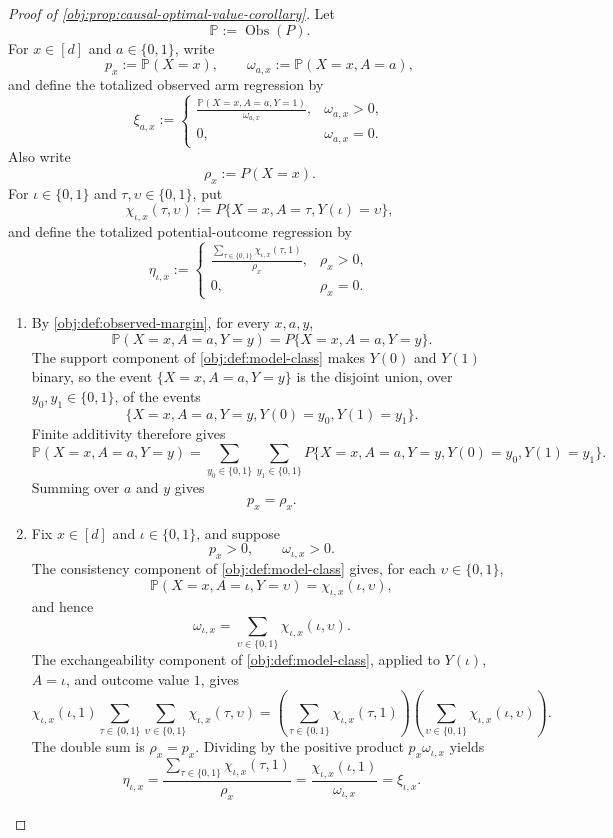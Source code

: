 \documentclass[11pt]{article}
\begin{document}
\begin{proof}[Proof of \cref{obj:prop:causal-optimal-value-corollary}]
Let
\[
\mathbb P:=\operatorname{Obs}(P).
\]
For \(x\in[d]\) and \(a\in\{0,1\}\), write
\[
p_x:=\mathbb P(X=x),
\qquad
\omega_{a,x}:=\mathbb P(X=x,A=a),
\]
and define the totalized observed arm regression by
\[
\xi_{a,x}:=
\begin{cases}
\displaystyle
\frac{\mathbb P(X=x,A=a,Y=1)}{\omega_{a,x}},
& \omega_{a,x}>0,\\[1.2ex]
0,& \omega_{a,x}=0.
\end{cases}
\]
Also write
\[
\rho_x:=P(X=x).
\]
For \(\iota\in\{0,1\}\) and \(\tau,\upsilon\in\{0,1\}\), put
\[
\chi_{\iota,x}(\tau,\upsilon)
:=
P\{X=x,A=\tau,Y(\iota)=\upsilon\},
\]
and define the totalized potential-outcome regression by
\[
\eta_{\iota,x}:=
\begin{cases}
\displaystyle
\frac{\sum_{\tau\in\{0,1\}}\chi_{\iota,x}(\tau,1)}{\rho_x},
& \rho_x>0,\\[1.2ex]
0,& \rho_x=0.
\end{cases}
\]

\begin{enumerate}
\item By \cref{obj:def:observed-margin}, for every \(x,a,y\),
\[
\mathbb P(X=x,A=a,Y=y)
=
P\{X=x,A=a,Y=y\}.
\]
The support component of \cref{obj:def:model-class} makes \(Y(0)\) and \(Y(1)\) binary, so the event \(\{X=x,A=a,Y=y\}\) is the disjoint union, over \(y_0,y_1\in\{0,1\}\), of the events
\[
\{X=x,A=a,Y=y,Y(0)=y_0,Y(1)=y_1\}.
\]
Finite additivity therefore gives
\[
\mathbb P(X=x,A=a,Y=y)
=
\sum_{y_0\in\{0,1\}}\sum_{y_1\in\{0,1\}}
P\{X=x,A=a,Y=y,Y(0)=y_0,Y(1)=y_1\}.
\]
Summing over \(a\) and \(y\) gives
\[
p_x=\rho_x .
\]

\item Fix \(x\in[d]\) and \(\iota\in\{0,1\}\), and suppose
\[
p_x>0,
\qquad
\omega_{\iota,x}>0.
\]
The consistency component of \cref{obj:def:model-class} gives, for each \(\upsilon\in\{0,1\}\),
\[
\mathbb P(X=x,A=\iota,Y=\upsilon)
=
\chi_{\iota,x}(\iota,\upsilon),
\]
and hence
\[
\omega_{\iota,x}
=
\sum_{\upsilon\in\{0,1\}}\chi_{\iota,x}(\iota,\upsilon).
\]
The exchangeability component of \cref{obj:def:model-class}, applied to \(Y(\iota)\), \(A=\iota\), and outcome value \(1\), gives
\[
\chi_{\iota,x}(\iota,1)
\sum_{\tau\in\{0,1\}}\sum_{\upsilon\in\{0,1\}}
\chi_{\iota,x}(\tau,\upsilon)
=
\left(\sum_{\tau\in\{0,1\}}\chi_{\iota,x}(\tau,1)\right)
\left(\sum_{\upsilon\in\{0,1\}}\chi_{\iota,x}(\iota,\upsilon)\right).
\]
The double sum is \(\rho_x=p_x\).  Dividing by the positive product
\(p_x\omega_{\iota,x}\) yields
\[
\eta_{\iota,x}
=
\frac{\sum_{\tau\in\{0,1\}}\chi_{\iota,x}(\tau,1)}{\rho_x}
=
\frac{\chi_{\iota,x}(\iota,1)}{\omega_{\iota,x}}
=
\xi_{\iota,x}.
\]


\end{enumerate}
\end{proof}
\end{document}
